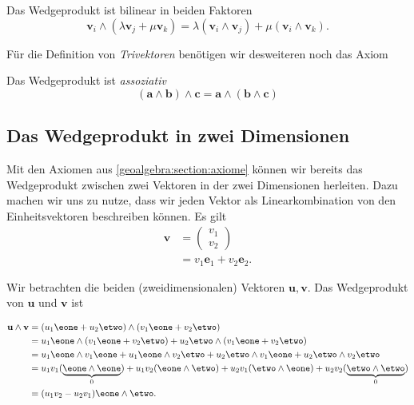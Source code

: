 \begin{axiom}
  Das Wedgeprodukt ist bilinear in beiden Faktoren
  \begin{equation}
  \mathbf{v}_i \wedge (\lambda \mathbf{v}_j + \mu \mathbf{v}_k) 
  = \lambda (\mathbf{v}_i \wedge \mathbf{v}_j) + \mu (\mathbf{v}_i \wedge \mathbf{v}_k).
    \label{geoalgebra:eq:bilinear}
  \end{equation}
\end{axiom}

Für die Definition von \emph{Trivektoren} benötigen wir desweiteren noch das Axiom
\begin{axiom}
  Das Wedgeprodukt ist \em{assoziativ}
  \begin{equation*}
    (\mathbf{a} \wedge \mathbf{b}) \wedge \mathbf{c} = \mathbf{a} \wedge (\mathbf{b} \wedge \mathbf{c})
  \end{equation*}
\end{axiom}

\subsection{Das Wedgeprodukt in zwei Dimensionen}

Mit den Axiomen aus \autoref{geoalgebra:section:axiome} können wir bereits das Wedgeprodukt zwischen zwei
Vektoren in der zwei Dimensionen herleiten.
Dazu machen wir uns zu nutze, dass wir jeden Vektor als
Linearkombination von den Einheitsvektoren beschreiben können.
Es gilt
\begin{align}
  \mathbf{v} &= \begin{pmatrix} v_1 \\ v_2 \end{pmatrix} \\
    &= v_1 \mathbf{e}_1 + v_2 \mathbf{e}_2.
\end{align}

\begin{definition}
  Wir betrachten die beiden (zweidimensionalen) Vektoren $\mathbf{u},
  \mathbf{v}$.
  Das Wedgeprodukt von $\mathbf{u}$ und $\mathbf{v}$ ist

  \begin{equation}
    \begin{aligned}
    \mathbf{u} \wedge \mathbf{v} &= (u_1 \eone + u_2 \etwo) \wedge
    (v_1 \eone + v_2 \etwo) \\
    &= u_1 \eone \wedge (v_1 \eone + v_2 \etwo) + u_2 \etwo \wedge (v_1 \eone + v_2 \etwo) \\
    &= u_1 \eone \wedge v_1 \eone + u_1 \eone \wedge v_2 \etwo + u_2 \etwo \wedge v_1 \eone + u_2 \etwo \wedge v_2 \etwo \\
    &= u_1 v_1 (\underbrace{\eone \wedge \eone}_{0}) + u_1 v_2 (\eone \wedge \etwo) + u_2 v_1 (\etwo \wedge \eone) + u_2 v_2 (\underbrace{\etwo \wedge \etwo}_{0}) \\
    &= (u_1 v_2 - u_2 v_1) \eone \wedge \etwo.
    \end{aligned}
  \end{equation}
\end{definition}

